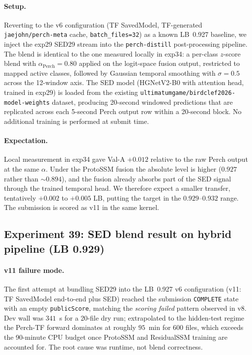 \paragraph{Setup.}
Reverting to the v6 configuration (TF SavedModel, TF-generated
\texttt{jaejohn/perch-meta} cache, \texttt{batch\_files=32}) as a
known LB~0.927 baseline, we inject the exp29 SED29 stream into the
\texttt{perch-distill} post-processing pipeline. The blend is
identical to the one measured locally in exp34: a per-class
$z$-score blend with $\alpha_{\text{Perch}} = 0.80$ applied on the
logit-space fusion output, restricted to mapped active classes,
followed by Gaussian temporal smoothing with
$\sigma = 0.5$ across the 12-window axis. The SED model
(HGNetV2-B0 with attention head, trained in exp29) is loaded from
the existing \texttt{ultimatumgame/birdclef2026-model-weights}
dataset, producing 20-second windowed predictions that are
replicated across each 5-second Perch output row within a 20-second
block. No additional training is performed at submit time.

\paragraph{Expectation.}
Local measurement in exp34 gave Val-A $+0.012$ relative to the
raw Perch output at the same $\alpha$. Under the ProtoSSM fusion
the absolute level is higher ($0.927$ rather than $\sim 0.894$), and
the fusion already absorbs part of the SED signal through the
trained temporal head. We therefore expect a smaller transfer,
tentatively $+0.002$ to $+0.005$ LB, putting the target in the
$0.929$--$0.932$ range. The submission is scored as v11 in the
same kernel.

\subsection{Experiment 39: SED blend result on hybrid pipeline (LB 0.929)}

\paragraph{v11 failure mode.}
The first attempt at bundling SED29 into the LB~0.927 v6 configuration
(v11: TF SavedModel end-to-end plus SED) reached the submission
\texttt{COMPLETE} state with an empty \texttt{publicScore}, matching
the \emph{scoring failed} pattern observed in v8. Dev wall was $341$~s
for a 20-file dry run; extrapolated to the hidden-test regime the
Perch-TF forward dominates at roughly $95$~min for 600 files, which
exceeds the 90-minute CPU budget once ProtoSSM and ResidualSSM
training are accounted for. The root cause was runtime, not blend
correctness.


